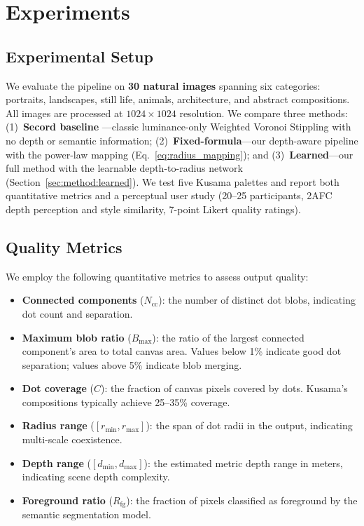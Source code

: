 \section{Experiments}
\label{sec:experiments}

\subsection{Experimental Setup}

We evaluate the pipeline on \textbf{30 natural images} spanning six
categories: portraits, landscapes, still life, animals, architecture,
and abstract compositions. All images are processed at $1024 \times 1024$
resolution. We compare three methods: (1)~\textbf{Secord baseline}
---classic luminance-only Weighted Voronoi Stippling
\citep{secord2002weighted} with no depth or semantic information;
(2)~\textbf{Fixed-formula}---our depth-aware pipeline with the
power-law mapping (Eq.~\ref{eq:radius_mapping}); and
(3)~\textbf{Learned}---our full method with the learnable
depth-to-radius network (Section~\ref{sec:method:learned}). We test
five Kusama palettes and report both quantitative metrics and a
perceptual user study (20--25 participants, 2AFC depth perception
and style similarity, 7-point Likert quality ratings).

\subsection{Quality Metrics}

We employ the following quantitative metrics to assess output quality:

\begin{itemize}
    \item \textbf{Connected components} ($N_{\text{cc}}$): the number of
    distinct dot blobs, indicating dot count and separation.
    \item \textbf{Maximum blob ratio} ($B_{\max}$): the ratio of the
    largest connected component's area to total canvas area. Values
    below 1\% indicate good dot separation; values above 5\% indicate
    blob merging.
    \item \textbf{Dot coverage} ($C$): the fraction of canvas pixels
    covered by dots. Kusama's compositions typically achieve 25--35\%
    coverage.
    \item \textbf{Radius range} ($[r_{\min}, r_{\max}]$): the span of
    dot radii in the output, indicating multi-scale coexistence.
    \item \textbf{Depth range} ($[d_{\min}, d_{\max}]$): the estimated
    metric depth range in meters, indicating scene depth complexity.
    \item \textbf{Foreground ratio} ($R_{\text{fg}}$): the fraction of
    pixels classified as foreground by the semantic segmentation model.
\end{itemize}


